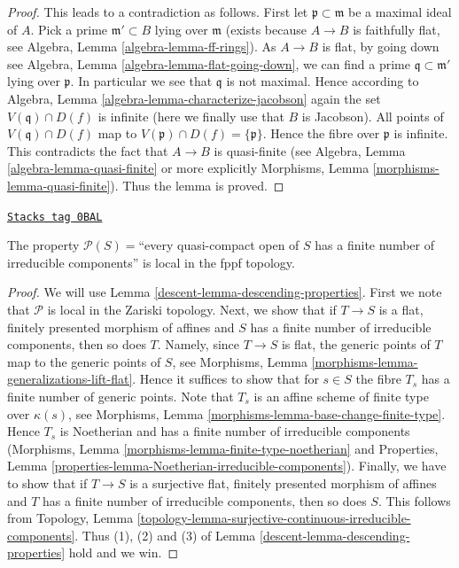 \begin{proof}
\medskip\noindent
This leads to a contradiction as follows. First let
$\mathfrak p \subset \mathfrak m$ be a maximal ideal of $A$.
Pick a prime $\mathfrak m' \subset B$ lying over $\mathfrak m$
(exists because $A \to B$ is faithfully flat, see
Algebra, Lemma \ref{algebra-lemma-ff-rings}).
As $A \to B$ is flat, by going down see
Algebra, Lemma \ref{algebra-lemma-flat-going-down},
we can find a prime $\mathfrak q \subset \mathfrak m'$ lying over
$\mathfrak p$. In particular we see that $\mathfrak q$ is not
maximal. Hence according to
Algebra, Lemma \ref{algebra-lemma-characterize-jacobson} again
the set $V(\mathfrak q) \cap D(f)$ is infinite
(here we finally use that $B$ is Jacobson).
All points of $V(\mathfrak q) \cap D(f)$ map to
$V(\mathfrak p) \cap D(f) = \{\mathfrak p\}$. Hence the
fibre over $\mathfrak p$ is infinite. This contradicts the
fact that $A \to B$ is quasi-finite (see
Algebra, Lemma \ref{algebra-lemma-quasi-finite}
or more explicitly
Morphisms, Lemma \ref{morphisms-lemma-quasi-finite}).
Thus the lemma is proved.
\end{proof}

\begin{lemma}
\label{descent-lemma-locally-finite-nr-irred-local-fppf}
\href{https://stacks.math.columbia.edu/tag/0BAL}{\texttt{Stacks tag 0BAL}}

The property $\mathcal{P}(S) =$``every quasi-compact open of $S$
has a finite number of irreducible components'' is local
in the fppf topology.
\end{lemma}

\begin{proof}

We will use Lemma \ref{descent-lemma-descending-properties}. First we note that
$\mathcal{P}$ is local in the Zariski topology.
Next, we show that if $T \to S$ is a flat, finitely presented
morphism of affines and $S$ has a finite number of irreducible
components, then so does $T$. Namely, since $T \to S$ is flat,
the generic points of $T$ map to the generic points of $S$, see
Morphisms, Lemma \ref{morphisms-lemma-generalizations-lift-flat}.
Hence it suffices to show that for $s \in S$ the fibre $T_s$
has a finite number of generic points. Note that $T_s$ is an
affine scheme of finite type over $\kappa(s)$, see
Morphisms, Lemma \ref{morphisms-lemma-base-change-finite-type}.
Hence $T_s$ is Noetherian and has a finite number of irreducible components
(Morphisms, Lemma \ref{morphisms-lemma-finite-type-noetherian} and
Properties, Lemma \ref{properties-lemma-Noetherian-irreducible-components}).
Finally, we have to show that if $T \to S$ is a surjective flat,
finitely presented morphism of affines and $T$ has a finite number of
irreducible components, then so does $S$. This follows from Topology, Lemma
\ref{topology-lemma-surjective-continuous-irreducible-components}.
Thus (1), (2) and (3) of Lemma \ref{descent-lemma-descending-properties} hold
and we win.
\end{proof}

